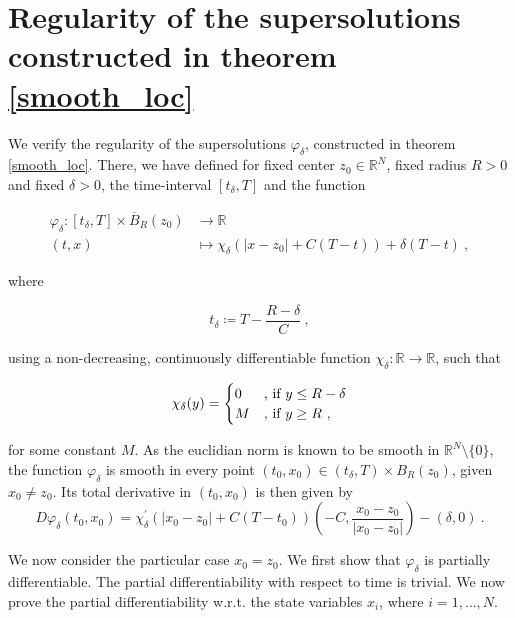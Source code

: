 \section{Regularity of the supersolutions constructed in theorem \ref{smooth_loc}}
\label{smoothness_supersolutions}

We verify the regularity of the supersolutions $ \varphi_{\delta} $, constructed in theorem \ref{smooth_loc}. There, we have defined for fixed center $ z_0 \in \mathbb{R}^N $, fixed radius $ R > 0 $ and fixed $ \delta > 0 $, the time-interval $ \left[t_{\delta}, T \right] $ and the function

\begin{align*}
\varphi_{\delta} : \left[t_{\delta}, T \right] \times \overline{B}_{R}(z_0) &\to \mathbb{R} \\ 
(t, x) &\mapsto \chi_{\delta}(\lvert x - z_0 \rvert + C (T - t)) + \delta(T - t) \ ,
\end{align*}

where

\begin{equation*}
	t_{\delta} \coloneqq T - \frac{R - \delta}{C} \ ,
\end{equation*}

using a non-decreasing, continuously differentiable function $ \chi_{\delta} : \mathbb{R} \to \mathbb{R} $, such that

\begin{align*}
\chi_{\delta}(y) = \begin{cases}
0 &\hbox{, if } y \leq R - \delta \\
M &\hbox{, if }y \geq R \ ,
\end{cases} 
\end{align*}

for some constant $ M $. As the euclidian norm is known to be smooth in $ \mathbb{R}^N \setminus \{ 0 \} $, the function $ \varphi_{\delta} $ is smooth in every point $ (t_0, x_0) \in \left(t_{\delta}, T \right) \times B_R(z_0) $, given $ x_0 \neq z_0 $. Its total derivative in $ (t_0, x_0) $ is then given by
\begin{equation*}
	D \varphi_{\delta}(t_0, x_0) = \chi_{\delta}^{\prime}\left(\lvert x_0 - z_0 \rvert + C(T - t_0)\right)\left(- C, \frac{x_0 - z_0}{\lvert x_0 - z_0 \rvert}\right) - \left(\delta, 0 \right) \ .
\end{equation*}

We now consider the particular case $ x_0 = z_0 $. We first show that $ \varphi_{\delta} $ is partially differentiable. The partial differentiability with respect to time is trivial. We now prove the partial differentiability w.r.t. the state variables $ x_i $, where $ i = 1, \ldots, N $.

